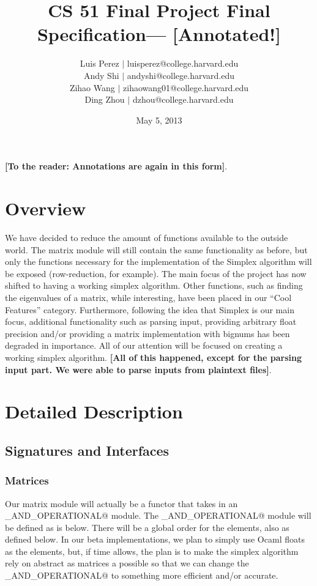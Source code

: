 \documentclass[letterpaper,11pt]{article}
\newcommand{\annot}[1]{\textbf{\color{BrickRed} [#1]}}
\begin{document}
\title{CS 51 Final Project Final Specification---{\annot{Annotated!}}}
\author{
Luis Perez $|$ luisperez@college.harvard.edu \\ 
Andy Shi $|$ andyshi@college.harvard.edu \\ 
Zihao Wang $|$ zihaowang01@college.harvard.edu \\ 
Ding Zhou $|$ dzhou@college.harvard.edu
}
\date{May 5, 2013}
\maketitle

{\annot{To the reader: Annotations are again in this form}}.

\section{Overview}

We have decided to reduce the amount of functions available to the outside
world. The matrix module will still contain the same functionality as before,
but only the functions necessary for the implementation of the Simplex algorithm
will be exposed (row-reduction, for example). The main focus of the project has
now shifted to having a working simplex algorithm. Other functions, such as
finding the eigenvalues of a matrix, while interesting, have been placed in our
“Cool Features” category. Furthermore, following the idea that Simplex is our
main focus, additional functionality such as parsing input, providing arbitrary
float precision and/or providing a matrix implementation with bignums has been
degraded in importance. All of our attention will be focused on creating a
working simplex algorithm. {\annot{All of this happened, except for the parsing input part. We were able to parse inputs from plaintext files}}.

\section{Detailed Description}
\subsection{Signatures and Interfaces}
\subsubsection{Matrices}

Our matrix module will actually be a functor that takes in an
\verb@ORDERED_AND_OPERATIONAL@ module. The \verb@ORDERED_AND_OPERATIONAL@ module
will be defined as is below. There will be a global order for the elements, also
as defined below. In our beta implementations, we plan to simply use Ocaml
floats as the elements, but, if time allows, the plan is to make the simplex
algorithm rely on abstract as matrices a possible so that we can change the
\verb@ORDERED_AND_OPERATIONAL@ to something more efficient and/or accurate.
\end{document}
